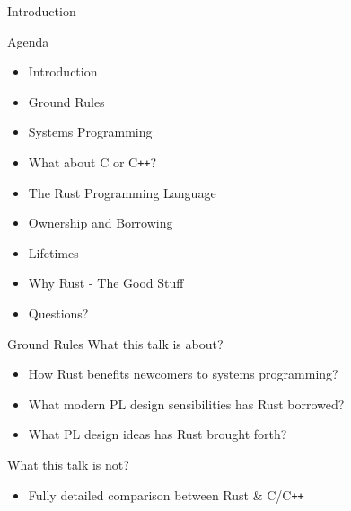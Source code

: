 \begin{section}{Introduction}
  \begin{frame}{Agenda}
    \begin{itemize}
    \item Introduction
    \item Ground Rules
    \item Systems Programming
    \item What about C or C\texttt{++}?
    \item The Rust Programming Language
    \item Ownership and Borrowing
    \item Lifetimes
    \item Why Rust - The Good Stuff
    \item Questions?
    \end{itemize}
  \end{frame}

  \begin{frame}{Ground Rules}
    What this talk is about?
    \begin{itemize}
    \item How Rust benefits newcomers to systems programming?
    \item What modern PL design sensibilities has Rust borrowed?
    \item What PL design ideas has Rust brought forth?
    \end{itemize}

    What this talk is not?
    \begin{itemize}
    \item Fully detailed comparison between Rust \& C/C\texttt{++}
    \end{itemize}
  \end{frame}
\end{section}
